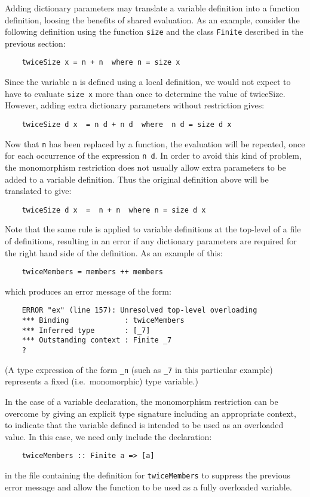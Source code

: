 \IT  Adding dictionary parameters may translate a  variable  definition
     into  a  function  definition,  loosing  the  benefits  of  shared
     evaluation.  As an  example,  consider  the  following  definition
     using the function \verb"size" and the class 
     \verb"Finite"  described  in  the
     previous section:
\begin{verbatim}
    twiceSize x = n + n  where n = size x
\end{verbatim}
     Since the variable n is defined using a local definition, we would
     not expect to have to evaluate \verb"size x" more than once to  determine
     the  value  of  twiceSize.   However,  adding   extra   dictionary
     parameters without restriction gives:
\begin{verbatim}
    twiceSize d x  = n d + n d  where  n d = size d x
\end{verbatim}
     Now that \verb"n" has been replaced by a function, the evaluation will be
     repeated, once for each occurrence of the expression  \verb"n d".   In
     order to avoid this kind of problem, the monomorphism  restriction
     does not usually allow extra parameters to be added to a  variable
     definition.  Thus the original definition above will be translated
     to give:
\begin{verbatim}
    twiceSize d x  =  n + n  where n = size d x
\end{verbatim}
     Note that the same rule is applied to variable definitions at  the
     top-level of a file of definitions, resulting in an error  if  any
     dictionary parameters are required for the right hand side of  the
     definition.  As an example of this:
\begin{verbatim}
    twiceMembers = members ++ members
\end{verbatim}
     which produces an error message of the form:
\begin{verbatim}
    ERROR "ex" (line 157): Unresolved top-level overloading
    *** Binding             : twiceMembers
    *** Inferred type       : [_7]
    *** Outstanding context : Finite _7
    ?
\end{verbatim}
     (A type expression of the form \verb"_n" (such  as  \verb"_7"  in  this
     particular example) represents a  fixed  (i.e.\  monomorphic)  type
     variable.)

     In  the  case  of  a  variable   declaration,   the   monomorphism
     restriction can be overcome by giving an explicit  type  signature
     including an appropriate context, to indicate  that  the  variable
     defined is intended to be used as an overloaded  value.   In  this
     case, we need only include the declaration:
\begin{verbatim}
    twiceMembers :: Finite a => [a]
\end{verbatim}
     in the file containing the definition for \verb"twiceMembers" to suppress
     the previous error message and allow the function to be used as  a
     fully overloaded variable.

